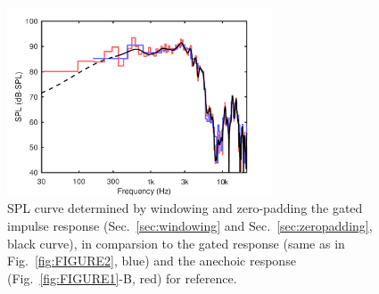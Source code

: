 \documentclass[12pt,a4paper]{article}
\providecommand{\secn}[1]{Sec.~\ref{sec:#1}}
\providecommand{\figlabel}[1]{\label{fig:#1}}
\providecommand{\figr}[1]{Fig.~\ref{fig:#1}}
\begin{document}
\begin{figure}[tbp]
  \begin{center}
    \includegraphics[width=0.7\textwidth]{FIGURE5}
    \caption{SPL curve determined by windowing and zero-padding the gated impulse response (\secn{windowing} and \secn{zeropadding}, black curve), in comparsion to the gated response (same as in \figr{FIGURE2}, blue) and the anechoic response (\figr{FIGURE1}-B, red) for reference.}
    \figlabel{FIGURE5}
  \end{center}
\end{figure}
\end{document}

